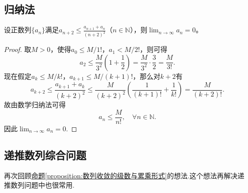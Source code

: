 \documentclass[../../main.tex]{subfiles}
\begin{document}
\subsection{归纳法}

\begin{example}
设正数列\(\{a_n\}\)满足\(a_{n+2} \leqslant \frac{a_{n+1} + a_n}{(n+2)^2}\)（\(n \in \mathbb{N}\)），则\(\lim_{n \to \infty} a_n = 0\)。
\end{example}
\begin{proof}
取\(M > 0\)，使得\(a_0 \leqslant M/1!\)，\(a_1 < M/2!\)，则可得
\[
a_2 \leqslant \frac{M}{3^2}\left(1 + \frac{1}{2}\right) = \frac{M}{3^2} \cdot \frac{3}{2} = \frac{M}{3!}.
\]
现在假定\(a_k \leqslant M/k!\)，\(a_{k+1} \leqslant M/(k+1)!\)，那么对\(k+2\)有
\[
a_{k+2} \leqslant \frac{a_{k+1} + a_k}{(k+2)^2} \leqslant \frac{M}{(k+2)^2}\left( \frac{1}{(k+1)!} + \frac{1}{k!} \right) = \frac{M}{(k+2)!}.
\]
故由数学归纳法可得$$a_n\leqslant \frac{M}{n!},\quad \forall n\in \mathbb{N}.$$
因此\(\lim_{n \to \infty} a_n = 0.\)
\end{proof}


\subsection{递推数列综合问题}

再次回顾\hyperref[proposition:数列收敛的级数与累乘形式]{命题\ref{proposition:数列收敛的级数与累乘形式}}的想法.这个想法再解决递推数列问题中也很常用.
\end{document}
